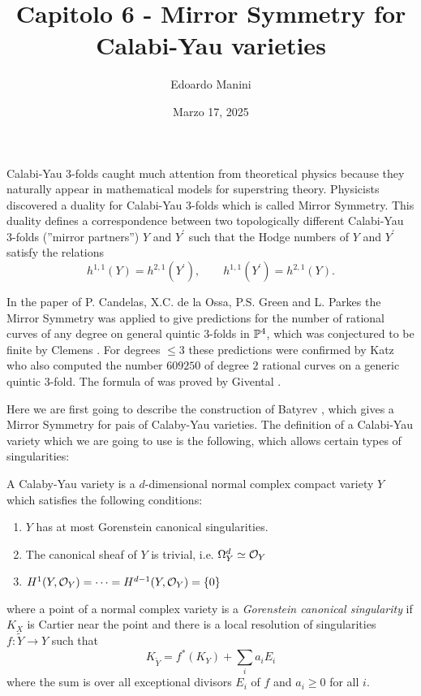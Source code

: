 \documentclass[../main.tex]{subfiles}
\title{Capitolo 6 - Mirror Symmetry for Calabi-Yau varieties}
\author{Edoardo Manini}
\date{Marzo 17, 2025}
\begin{document}
\ifSubfilesClassLoaded{
\maketitle
\tableofcontents
}{}


Calabi-Yau 3-folds caught much attention from theoretical physics because they naturally appear in mathematical models for superstring theory. Physicists discovered a duality for Calabi-Yau 3-folds which is called Mirror Symmetry. This duality defines a correspondence between two topologically different Calabi-Yau 3-folds (”mirror partners”) $Y$ and $Y^\prime$
such that the Hodge numbers of $Y$ and $Y^\prime$ satisfy the relations 
\[
h^{1,1}(Y) = h^{2,1}(Y^\prime), \qquad  h^{1,1}(Y^\prime) = h^{2,1}(Y).
\]

In the paper of P. Candelas, X.C. de la Ossa, P.S. Green and L. Parkes \cite{COGP91} the Mirror Symmetry was applied to give predictions for the number of rational curves of any degree on general quintic 3-folds in $\mathbb{P}^4$, which was conjectured to be finite by Clemens \cite{Cl84}. 
For degrees $\leq 3$ these predictions were confirmed by Katz \cite{Katz86} who also computed the number $609250$ of degree $2$ rational curves on a generic quintic 3-fold. The formula of \cite{COGP91} was proved by Givental \cite{Gi96}.

Here we are first going to describe the construction of Batyrev \cite{Bat94}, which gives a Mirror Symmetry for pais of Calaby-Yau varieties. 
The definition of a Calabi-Yau variety which we are going to use is the following, which allows certain types of singularities:
\begin{defn} \label{defnCalabiYau}
    A Calaby-Yau variety is a $d$-dimensional normal complex compact variety $Y$ which satisfies the following conditions:
    \begin{enumerate}
        \item $Y$ has at most Gorenstein canonical singularities.
        \item The canonical sheaf of $Y$ is trivial, i.e. $\Omega^d_Y \simeq \mathcal{O}_Y$
        \item $H^1(Y,\mathcal{O}_Y)= \cdots=H^{d-1}(Y,\mathcal{O}_Y)=\{0\}$
    \end{enumerate}
\end{defn}
where a point of a normal complex variety is a \emph{Gorenstein canonical singularity} if $K_X$ is Cartier near the point and there is a local resolution of singularities $f \colon \tilde{Y} \to Y$ such that
\[
K_{\tilde{Y}} = f^*(K_Y)+ \sum_i a_i E_i
\]
where the sum is over all exceptional divisors $E_i$ of $f$ and $a_i \geq 0$ for all $i$.
\end{document}
